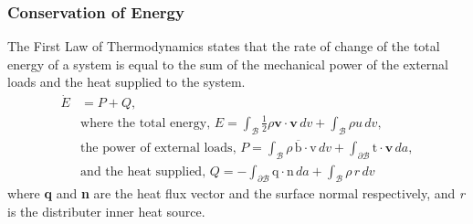 \documentclass[../main.tex]{subfiles}
\begin{document}
\subsubsection{Conservation of Energy}
The First Law of Thermodynamics states that the rate of change of the total energy of a system is equal to the
 sum of the mechanical power of the external loads and the heat supplied to the system.
\begin{align}\label{first_thermo}
    \dot{E} &= P + Q,\\
    &\text{where the total energy,} \, \, E = \int_{\mathcal{B}} \frac{1}{2} \rho \mathrm{\boldsymbol{v}} \cdot \mathrm{\boldsymbol{v}} \, dv + \int_{\mathcal{B}} \rho u \, dv,\\
    &\text{the power of external loads,} \,\, P = \int_{\mathcal{B}} \rho \,\boldsymbol{\overline{\mathrm{b}}} \cdot \boldsymbol{\mathrm{v}} \, dv + \int_{\partial \mathcal{B}} \boldsymbol{\mathrm{t}} \cdot \mathrm{\boldsymbol{v}} \, da,\\
    &\text{and the heat supplied,} \, \, Q = - \int_{\partial \mathcal{B}} \boldsymbol{\mathrm{q}} \cdot \boldsymbol{\mathrm{n}} \, da + \int_{\mathcal{B}} \rho \, r \,dv
\end{align}
where \textbf{q} and \textbf{n} are the heat flux vector and the surface normal respectively, and \emph{r} is the distributer inner heat source.
\end{document}
